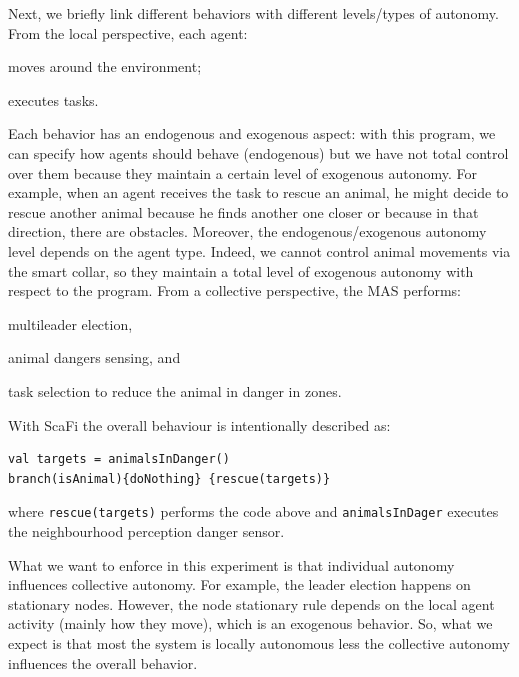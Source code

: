 \documentclass[jsan,article,accept,moreauthors,pdftex]{Definitions/mdpi}
\begin{document}
\begin{paracol}{2}
\switchcolumn



%
Next, we briefly link different 
 behaviors with different levels/types of autonomy. 
%
From the local perspective, each agent:
\begin{inlinelist}
\item moves around the environment;
\item executes tasks.
\end{inlinelist}
%
Each behavior has an endogenous and exogenous aspect: with this program, 
 we can specify how agents should behave (endogenous) but we have not total 
 control over them because they maintain a certain level of exogenous autonomy. 
%
For example, when an agent receives the task to rescue an animal, 
 he might decide to rescue another animal because he finds another one closer or
 because in that direction, there are obstacles. 
%
Moreover, the endogenous/exogenous autonomy level depends on the agent type. 
 Indeed, we cannot control animal movements via the smart collar, 
 so they maintain a total level of exogenous autonomy with respect to the program.
%
From a collective perspective, the MAS performs: 
\begin{inlinelist}
\item multileader election,
\item animal dangers sensing, and
\item task selection to reduce the animal in danger in zones.
\end{inlinelist}
%
With ScaFi the overall behaviour is intentionally described as:
\begin{lstlisting}
val targets = animalsInDanger()
branch(isAnimal){doNothing} {rescue(targets)}
\end{lstlisting}
where \lstinline|rescue(targets)| performs the code above and \lstinline|animalsInDager|
  executes the neighbourhood perception danger sensor.

What we want to enforce in this experiment 
 is that individual autonomy influences collective autonomy.
%
For example, the leader election happens on stationary nodes. 
 However, the node stationary rule depends on the local agent 
 activity (mainly how they move), which is an exogenous behavior.
%
So, what we expect is that most the system is locally autonomous less 
 the collective autonomy influences the overall behavior.
%
%

\end{paracol}
\end{document}
